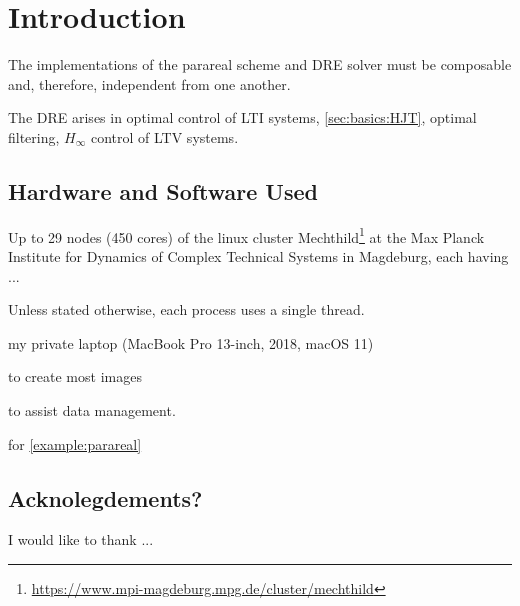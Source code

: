 \chapter{Introduction}

The implementations of the parareal scheme and \ac{DRE} solver must be composable and,
therefore, independent from one another.

The \ac{DRE} arises in \eg optimal control of \ac{LTI} systems, \cf \autoref{sec:basics:HJT},
optimal filtering, $H_\infty$ control of \ac{LTV} systems.

\section*{Hardware and Software Used}

Up to 29 nodes (450 cores) of the linux cluster Mechthild\footnote{\url{https://www.mpi-magdeburg.mpg.de/cluster/mechthild}}
at the Max Planck Institute for Dynamics of Complex Technical Systems in Magdeburg, each having ...

Unless stated otherwise, each process uses a single thread.

my private laptop (MacBook Pro 13-inch, 2018, macOS 11)

 \cite{Makie} to create most images

 \cite{DrWatson} to assist data management.

 \cite{DifferentialEquations} for \autoref{example:parareal}

\section*{Acknolegdements?}

I would like to thank ...
